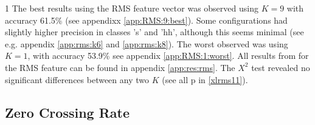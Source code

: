 	1
		The best results using the RMS feature vector was observed using $K=9$ with accuracy 61.5\% (see appendixx \ref{app:RMS:9:best}). Some configurations had slightly higher precision in classes 's' and 'hh', although this seems minimal (see e.g. appendix  \ref{app:rms:k6} and \ref{app:rms:k8}). The worst observed was using $K=1$, with accuracy 53.9\% see appendix \ref{app:RMS:1:worst}. All results from for the RMS feature can be found in appendix \ref{app:res:rms}. The $X^2$ test revealed no significant differences between any two $K$ (see all p in \ref{xlrms11}).
		
	
	\subsection{Zero Crossing Rate}
%		
%		
